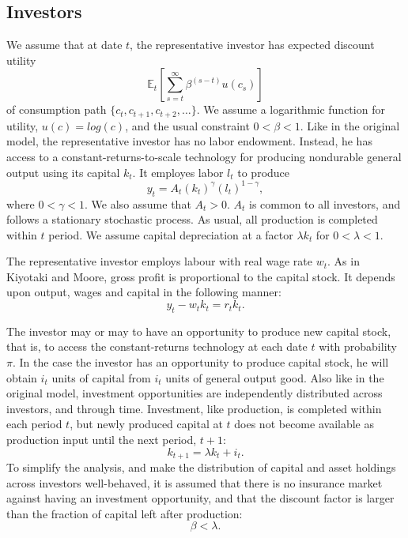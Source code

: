 \documentclass[12pt]{article}%
\begin{document}
\subsection{Investors}
We assume that at date $t$, the representative investor has expected discount utility
\begin{equation}
\mathbb{E}_t [\sum^{\infty}_{s=t} \beta^{(s-t)}u(c_s)]
\end{equation}
of consumption path $\{c_t, c_{t+1}, c_{t+2}, \dots \}$. We assume a logarithmic
function for utility, $u(c) = log(c)$, and the usual constraint $0<\beta<1$.
Like in the original model, the representative investor has no labor endowment.
Instead, he has access to a constant-returns-to-scale technology for producing
nondurable general output using its capital $k_t$. It employes labor
$l_t$ to produce
\begin{equation}
y_t = A_t (k_t)^{\gamma}(l_t)^{1-\gamma},
\end{equation}
where $0<\gamma<1$. We also assume that $A_t>0$. $A_t$ is common to all investors, and
follows a stationary stochastic process. As usual, all production is completed within $t$ period.
We assume capital depreciation at a factor $\lambda k_t$ for $0<\lambda<1$. 

The representative investor employs labour with real wage rate $w_t$. As in Kiyotaki and Moore, 
gross profit is proportional to the capital stock. It depends upon output,
wages and capital in the following manner:
\begin{equation}
y_t - w_{t}k_t = r_{t}k_{t}.
\end{equation}

The investor may or may to have an opportunity to produce new capital stock, that is, to access
the constant-returns technology at each date $t$ with probability $\pi$. In the case the investor has an opportunity
to produce capital stock, he will obtain $i_t$ units of capital from $i_t$ units of
general output good. Also like in the original model, investment opportunities
are independently distributed across investors, and through time. Investment,
like production, is completed within each period $t$, but newly produced capital at $t$ does not
become available as production input until the next period, $t+1$:
\begin{equation}
k_{t+1} = \lambda k_t + i_t.
\end{equation}
To simplify the analysis, and make the distribution of capital and
asset holdings across investors well-behaved, it is assumed that there is no insurance market against
having an investment opportunity, and that the discount factor is larger than
the fraction of capital left after production:
\begin{equation}
\beta < \lambda.
\end{equation}
\end{document}
